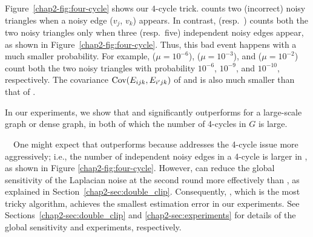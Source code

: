 Figure~\ref{chap2-fig:four-cycle} shows our $4$-cycle trick.
\AlgOne{} counts two (incorrect) noisy triangles when a noisy edge ($v_j$, $v_k$) appears.
In contrast,
\AlgTwo{} (resp.~\AlgThree{}) counts both the two noisy triangles
only when three (resp.~five) independent noisy edges appear,
as shown in Figure~\ref{chap2-fig:four-cycle}.
Thus, this bad event happens with a much smaller probability.
For example,
\AlgOne{} ($\mu=10^{-6}$),
\AlgTwo{} ($\mu=10^{-3}$), and
\AlgThree{} ($\mu=10^{-2}$)
count both the two noisy triangles with probability $10^{-6}$, $10^{-9}$, and $10^{-10}$, respectively.
The covariance $\operatorname{\text{Cov}}(E_{ijk},E_{i'jk})$ of \AlgTwo{} and \AlgThree{} is also much smaller than that of \AlgOne{}.


In our experiments, we show that \AlgTwo{} and \AlgThree{} significantly outperforms \AlgOne{}
for a large-scale graph or dense graph, in both of which
the number of 4-cycles in $G$ 
is 
large.

\smallskip
{}~~One
might expect that \AlgThree{} outperforms \AlgTwo{} because \AlgThree{} addresses the 4-cycle issue more aggressively; i.e.,
the number of independent noisy edges in a 4-cycle is larger in \AlgThree{},
as shown in Figure \ref{chap2-fig:four-cycle}.
However,
\AlgTwo{} can reduce the global sensitivity of the Laplacian noise
at the second round
more effectively than \AlgThree{}, as explained in Section~\ref{chap2-sec:double_clip}.
Consequently, \AlgTwo{}, which is the most tricky algorithm, achieves the smallest estimation error in our experiments.
See Sections~\ref{chap2-sec:double_clip} and \ref{chap2-sec:experiments} for details of the global sensitivity and experiments, respectively.

